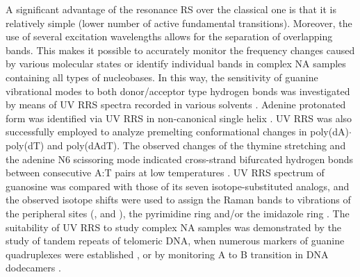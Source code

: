A significant advantage of the resonance RS over the classical one is that it
is relatively simple (lower number of active fundamental transitions).
Moreover, the use of several excitation wavelengths allows for the separation
of overlapping bands.
This makes it possible to accurately monitor the frequency changes caused by
various molecular states or identify individual bands in complex NA samples
containing all types of nucleobases.
In this way, the sensitivity of guanine vibrational modes to both
donor/acceptor type hydrogen bonds was investigated by means of UV RRS spectra
recorded in various solvents
\parencite{Toyama1996}.
Adenine protonated form was identified via UV RRS in non-canonical 
single helix
\parencite{Mukerji1995}.
UV RRS was also successfully employed to analyze premelting conformational
changes in poly(dA)$\cdot$poly(dT) and poly(dAdT).
The observed changes of the thymine  stretching and the
adenine N6 scissoring mode indicated cross-strand bifurcated hydrogen bonds
between consecutive A:T pairs at low temperatures
\parencite{Chan1997}.
UV RRS spectrum of guanosine was compared with those of its seven
isotope-substituted analogs, and the observed isotope shifts were used to
assign the Raman bands to vibrations of the peripheral sites
	(,
	and ),
the pyrimidine ring and/or the imidazole ring
\parencite{Toyama1999}.
The suitability of UV RRS to study complex NA samples was demonstrated by the
study of tandem repeats of telomeric DNA, when numerous markers of guanine
quadruplexes were established
\parencite{Krafft2002},
or by monitoring A to B transition in DNA dodecamers
\parencite{Knee2008}.
